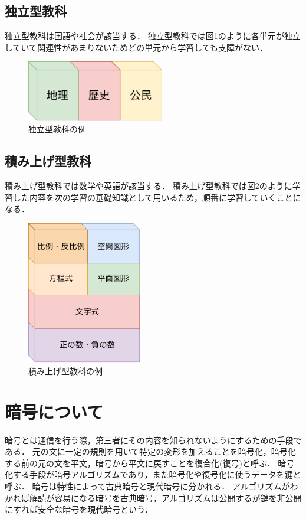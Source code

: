\documentclass[a4j,12pt]{jsarticle}
\begin{document}
\subsection{独立型教科}
独立型教科は国語や社会が該当する．
独立型教科では図\ref{fig:01}のように各単元が独立していて関連性があまりないためどの単元から学習しても支障がない．
\begin{figure}[H]
\centering
\includegraphics[width=6cm]{01.pdf}
\caption{独立型教科の例}
\label{fig:01}
\end{figure} 

\subsection{積み上げ型教科}
積み上げ型教科では数学や英語が該当する．
積み上げ型教科では図\ref{fig:04}のように学習した内容を次の学習の基礎知識として用いるため，順番に学習していくことになる．

\begin{figure}[H]
\centering
\includegraphics[width=5cm]{04.pdf}
\caption{積み上げ型教科の例}
\label{fig:04}
\end{figure} 

\section{暗号について}
暗号とは通信を行う際，第三者にその内容を知られないようにするための手段である．
元の文に一定の規則を用いて特定の変形を加えることを暗号化，暗号化する前の元の文を平文，暗号から平文に戻すことを復合化(復号)と呼ぶ．
暗号化する手段が暗号アルゴリズムであり，また暗号化や復号化に使うデータを鍵と呼ぶ．
暗号は特性によって古典暗号と現代暗号に分かれる．
アルゴリズムがわかれば解読が容易になる暗号を古典暗号，アルゴリズムは公開するが鍵を非公開にすれば安全な暗号を現代暗号という．
\end{document}
